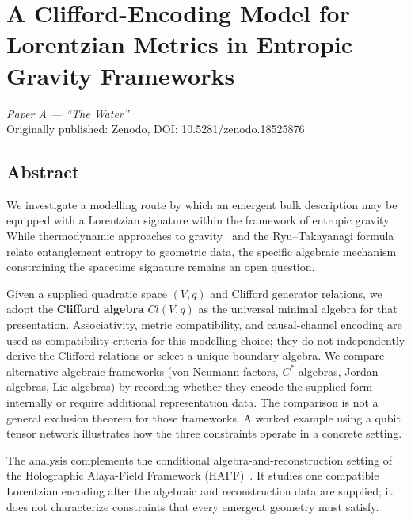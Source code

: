 \documentclass[12pt,a4paper,openany]{book}
\begin{document}
\tableofcontents

\mainmatter

\chapter{A Clifford-Encoding Model for Lorentzian Metrics in Entropic Gravity Frameworks}
\label{chap:paperA}

\begin{center}
\textit{Paper A --- ``The Water''}\\[0.5em]
Originally published: Zenodo, DOI: 10.5281/zenodo.18525876
\end{center}

\bigskip

\section*{Abstract}
We investigate a modelling route by which an emergent bulk description may be equipped with a Lorentzian signature within the framework of entropic gravity.
While thermodynamic approaches to gravity~\cite{Jacobson1995,Verlinde2011} and the Ryu--Takayanagi formula~\cite{RyuTakayanagi2006} relate entanglement entropy to geometric data, the specific algebraic mechanism constraining the spacetime signature remains an open question.

Given a supplied quadratic space $(V,q)$ and Clifford generator relations, we adopt the \textbf{Clifford algebra} $Cl(V,q)$ as the universal minimal algebra for that presentation.  Associativity, metric compatibility, and causal-channel encoding are used as compatibility criteria for this modelling choice; they do not independently derive the Clifford relations or select a unique boundary algebra.
We compare alternative algebraic frameworks (von Neumann factors, $C^*$-algebras, Jordan algebras, Lie algebras) by recording whether they encode the supplied form internally or require additional representation data.  The comparison is not a general exclusion theorem for those frameworks.
A worked example using a qubit tensor network illustrates how the three constraints operate in a concrete setting.

The analysis complements the conditional algebra-and-reconstruction setting of the Holographic Alaya-Field Framework (HAFF)~\cite{Liu2026PaperA,Liu2026PaperB}.  It studies one compatible Lorentzian encoding after the algebraic and reconstruction data are supplied; it does not characterize constraints that every emergent geometry must satisfy.
\end{document}
